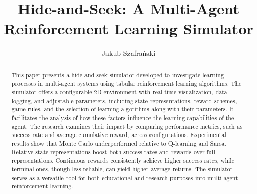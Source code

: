\documentclass[runningheads]{llncs}
\begin{document}
%
\title{Hide-and-Seek: A Multi-Agent Reinforcement Learning Simulator}
%
%
\author{Jakub Szafrański}
%
%
%
\maketitle              %
%
\begin{abstract}
This paper presents a hide-and-seek simulator developed to investigate learning processes in multi-agent systems using tabular reinforcement learning algorithms. The simulator offers a configurable 2D environment with real-time visualization, data logging, and adjustable parameters, including state representations, reward schemes, game rules, and the selection of learning algorithms along with their parameters. It facilitates the analysis of how these factors influence the learning capabilities of the agent. The research examines their impact by comparing performance metrics, such as success rate and average cumulative reward, across configurations. Experimental results show that Monte Carlo underperformed relative to Q-learning and Sarsa. Relative state representations boost both success rates and rewards over full representations. Continuous rewards consistently achieve higher success rates, while terminal ones, though less reliable, can yield higher average returns. The simulator serves as a versatile tool for both educational and research purposes into multi-agent reinforcement learning.

\end{abstract}
\end{document}

